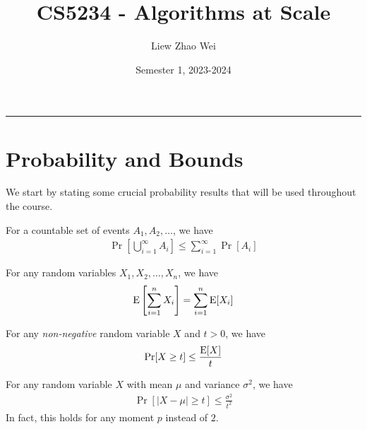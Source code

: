 \documentclass{article}
\title{CS5234 - Algorithms at Scale}
\author{Liew Zhao Wei}
\date{Semester 1, 2023-2024}
\begin{document}
\maketitle
\hrule

\section{Probability and Bounds}

We start by stating some crucial probability results that will be used throughout the course.

\begin{lemma}
  For a countable set of events $A_1, A_2, \ldots$, we have
  \begin{align}
    \Pr\left[\bigcup_{i=1}^\infty A_i\right] \le \sum_{i=1}^\infty \Pr[A_i]
  \end{align}
\end{lemma}

\begin{lemma}
  For any random variables $X_1, X_2, \ldots, X_n$, we have
  \begin{align}
    \operatorname{E}\left[\sum_{i=1}^n X_i\right] = \sum_{i=1}^n \operatorname{E}[X_i]
  \end{align}
\end{lemma}

\begin{lemma}
  For any \emph{non-negative} random variable $X$ and $t > 0$, we have
  \begin{align}
    \Pr[X \ge t] \le \frac{\operatorname{E}[X]}{t}
  \end{align}
\end{lemma}

\begin{lemma}
  For any random variable $X$ with mean $\mu$ and variance $\sigma^2$, we have
  \begin{align}
    \Pr[|X - \mu| \ge t] \le \frac{\sigma^2}{t^2}
  \end{align}
  In fact, this holds for any moment $p$ instead of $2$.
\end{lemma}
\end{document}
